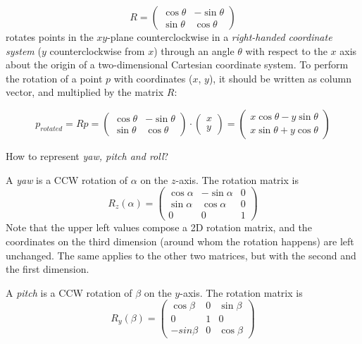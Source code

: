 \[
	R =
	{\begin{pmatrix}
		\cos \theta & -\sin \theta \\
		\sin \theta & \cos \theta
	\end{pmatrix}}
\]
rotates points in the $xy$-plane counterclockwise in a \textit{right-handed coordinate system} ($y$ counterclockwise from $x$) through an angle $\theta$ with respect to the $x$ axis about the origin of a two-dimensional Cartesian coordinate system. To perform the rotation of a point $p$ with coordinates ($x$, $y$), it should be written as column vector, and multiplied by the matrix $R$:
\bigbreak

\[
	p_{rotated} = Rp =
	{\begin{pmatrix}
		\cos \theta &-\sin \theta \\
		\sin \theta &\cos \theta
	\end{pmatrix}}
	\cdot
	{\begin{pmatrix}
		x \\
		y
	\end{pmatrix}} =
	{\begin{pmatrix}
		x\cos \theta -y\sin \theta \\
		x\sin \theta +y\cos \theta
	\end{pmatrix}}
\]
\bigbreak

How to represent \textit{yaw, pitch and roll}?
\bigbreak

A \textit{yaw} is a CCW rotation of $\alpha$ on the $z$-axis. The rotation matrix is
\[
	R_z(\alpha) =
	\begin{pmatrix}
		\cos\alpha & -\sin\alpha & 0 \\
		\sin\alpha & \cos\alpha & 0 \\
		0 & 0 & 1
	\end{pmatrix}
\]
Note that the upper left values compose a 2D rotation matrix, and the coordinates on the third dimension (around whom the rotation happens) are left unchanged. The same applies to the other two matrices, but with the second and the first dimension.
\bigbreak

A \textit{pitch} is a CCW rotation of $\beta$ on the $y$-axis. The rotation matrix is
\[
	R_y(\beta) =
	\begin{pmatrix}
		\cos\beta & 0 & \sin\beta \\
		0 & 1 & 0 \\
		-sin\beta & 0 & \cos\beta
	\end{pmatrix}
\]

